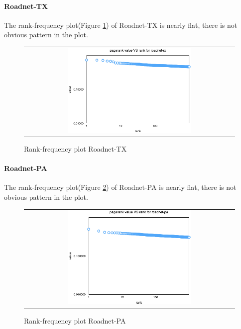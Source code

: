 \paragraph{Roadnet-TX}
The rank-frequency plot(Figure \ref{t2:tx}) of Roadnet-TX is nearly flat, there is not obvious pattern in the plot.
\begin{figure}[!htbf]
\begin{center}
\begin{tabular}{c}
     \includegraphics[width=0.6\textwidth]{FIG/t2_tx.png}\\
\end{tabular}
\caption{Rank-frequency plot Roadnet-TX}
\label{t2:tx}
\end{center}
\end{figure}

\paragraph{Roadnet-PA}
The rank-frequency plot(Figure \ref{t2:pa}) of Roadnet-PA is nearly flat, there is not obvious pattern in the plot.
\begin{figure}[!htbf]
\begin{center}
\begin{tabular}{c}
     \includegraphics[width=0.6\textwidth]{FIG/t2_pa.png}\\
\end{tabular}
\caption{Rank-frequency plot Roadnet-PA}
\label{t2:pa}
\end{center}
\end{figure}


